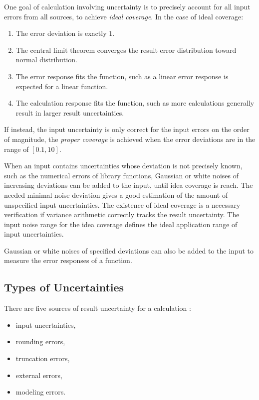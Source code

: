 \documentclass[twoside]{article}
\numberwithin{equation}{section}
\begin{document}
One goal of calculation involving uncertainty is to precisely account for all input errors from all sources, to achieve \emph{ideal coverage}.
In the case of ideal coverage:
\begin{enumerate}
\item The error deviation is exactly $1$.

\item The central limit theorem converges the result error distribution toward normal distribution.

\item The error response fits the function, such as a linear error response is expected for a linear function.

\item The calculation response fits the function, such as more calculations generally result in larger result uncertainties.

\end{enumerate}
If instead, the input uncertainty is only correct for the input errors on the order of magnitude, the \emph{proper coverage} is achieved when the error deviations are in the range of $[0.1, 10]$.

When an input contains uncertainties whose deviation is not precisely known, such as the numerical errors of library functions, Gaussian or white noises of increasing deviations can be added to the input, until idea coverage is reach.
The needed minimal noise deviation gives a good estimation of the amount of unspecified input uncertainties.
The existence of ideal coverage is a necessary verification if variance arithmetic correctly tracks the result uncertainty.
The input noise range for the idea coverage defines the ideal application range of input uncertainties.

Gaussian or white noises of specified deviations can also be added to the input to measure the error responses of a function.



\subsection{Types of Uncertainties}

There are five sources of result uncertainty for a calculation \cite{Statistical_Methods}\cite{Numerical_Recipes}:
\begin{itemize}
\item input uncertainties,
\item rounding errors,
\item truncation errors,
\item external errors,
\item modeling errors.
\end{itemize}
\end{document}
